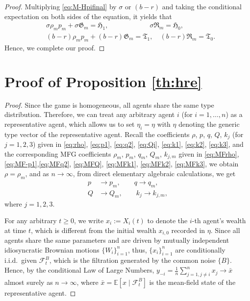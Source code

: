 \documentclass[11pt]{article}
\newcommand \E {\mathbb{E}}
\newenvironment{bluepar}
{\begingroup\color{blue}}
{\endgroup}
\numberwithin{equation}{section}
\renewcommand{\theequation}{\arabic{section}.\arabic{equation}}
\providecommand{\smn}{{-}} %
\begin{document}
\begin{proof}
	Multiplying \eqref{eq:M-Hpifinal} by $\sigma$ or $(b-r)$ and taking the conditional expectation on both sides of the equation, it yields that
	\begin{align*}
		&\sigma \rho_{\scriptscriptstyle m} p_{\scriptscriptstyle m}+  \sigma\mathfrak{G}_{\scriptscriptstyle m}=\mathfrak{H}_1,\qquad \qquad \qquad\sigma \mathfrak{R}_{\scriptscriptstyle m}=\mathfrak{H}_0,\\
&(b-r) \rho_{\scriptscriptstyle m} p_{\scriptscriptstyle m}+  (b-r)\mathfrak{G}_{\scriptscriptstyle m}=\mathfrak{T}_1,\quad (b-r) \mathfrak{R}_{\scriptscriptstyle m}=\mathfrak{T}_0.
	\end{align*}
Hence, we complete our proof.
\end{proof}

 \begin{bluepar}
\section{Proof of Proposition \ref{th:hre}}\label{app:hre}
\setcounter{equation}{0}
\renewcommand{\theequation}{D.\arabic{equation}}

	\begin{proof}
	Since the game is homogeneous, all agents share the same type distribution. Therefore, we can treat any arbitrary agent $i$ (for $i=1,\dots,n$) as a representative agent, which allows us to set $\eta_i=\eta$ with $\eta$ denoting the generic type vector of the representative agent.  Recall the coefficients \(\rho\), \(p\), \(q\), \(Q\), \(k_{j}\) (for \(j=1,2,3\)) given in \eqref{eq:rho}, \eqref{eq:p1}, \eqref{eq:q2}, \eqref{eq:Qi}, \eqref{eq:k1}, \eqref{eq:k2}, \eqref{eq:k3}, and the corresponding MFG coefficients \(\rho_{\scriptscriptstyle m}\), \(p_{\scriptscriptstyle m}\), \(q_{\scriptscriptstyle m}\), \(Q_{\scriptscriptstyle m}\), \(k_{j,\scriptscriptstyle m}\) given in \eqref{eq:MFrho},\eqref{eq:MF-p1},\eqref{eq:MFq2}, \eqref{eq:MFQ}, \eqref{eq:MFk1}, \eqref{eq:MFk2}, \eqref{eq:MFk3}, we obtain \(\rho = \rho_{\scriptscriptstyle m} \),  and as $n\to\infty$, from direct elementary algebraic calculations, we get
	\begin{align*}
	p&\to p_{\scriptscriptstyle m}  , \qquad
	 q\to q_{\scriptscriptstyle m} ,\\
	 Q&\to Q_{\scriptscriptstyle m},  \qquad
	k_j \to k_{j,m},
	\end{align*}
	where \(j=1,2,3\).

For any arbitrary $t \ge 0$, we write $x_i := X_i(t)$ to denote the $i$-th agent's wealth at time $t$, which is different from the initial wealth $x_{i,0}$ recorded in $\eta$. Since all agents share the same parameters and are driven by mutually independent idiosyncratic Brownian motions $\{W_i\}_{i=1}^n$, thus, $\{x_i\}_{i=1}^n$ are conditionally i.i.d.\ given $\mathcal{F}_t^B$, which is the filtration generated by the common noise $\{B\}$. Hence, by the conditional Law of Large Numbers, $y_{ \smn i} = \frac{1}{n}\sum_{j=1,j \neq i}^n x_j \to \bar{x}$ almost surely as $n\to\infty$, where $\bar{x}= \E\left[x\mid\mathcal{F}_t^B\right]$ is the mean-field state of the representative agent.
	

\end{proof}
\end{bluepar}
\end{document}
